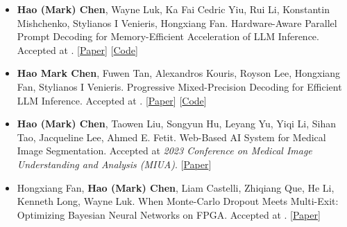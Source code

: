 \begin{itemize}
        \item \textbf{Hao (Mark) Chen}, Wayne Luk, Ka Fai Cedric Yiu, Rui Li, Konstantin Mishchenko, Stylianos I Venieris, Hongxiang Fan. Hardware-Aware Parallel Prompt Decoding for Memory-Efficient Acceleration of LLM Inference. Accepted at \EMNLP[2025]. [\href{https://arxiv.org/pdf/2405.18628}{Paper}] [\href{https://github.com/hmarkc/parallel-prompt-decoding}{Code}]
        \item \textbf{Hao Mark Chen}, Fuwen Tan, Alexandros Kouris, Royson Lee, Hongxiang Fan, Stylianos I Venieris. Progressive Mixed-Precision Decoding for Efficient LLM Inference. Accepted at \ICLR[2025]. [\href{https://arxiv.org/pdf/2410.13461}{Paper}] [\href{https://github.com/SamsungLabs/PMPD}{Code}]
        \item \textbf{Hao (Mark) Chen}, Taowen Liu, Songyun Hu, Leyang Yu, Yiqi Li, Sihan Tao, Jacqueline Lee, Ahmed E. Fetit. Web-Based AI System for Medical Image Segmentation. Accepted at \textit{2023 Conference on Medical Image Understanding and Analysis (MIUA)}. [\href{https://scholar.google.com/citations?view_op=view_citation&hl=en&user=O6ajbEoAAAAJ&pagesize=100&citation_for_view=O6ajbEoAAAAJ:u-x6o8ySG0sC}{Paper}]
        \item Hongxiang Fan, \textbf{Hao (Mark) Chen}, Liam Castelli, Zhiqiang Que, He Li, Kenneth Long, Wayne Luk. When Monte-Carlo Dropout Meets Multi-Exit: Optimizing Bayesian Neural Networks on FPGA. Accepted at \DAC[2023]. [\href{https://ieeexplore.ieee.org/iel7/10247654/10247655/10247954.pdf}{Paper}]
\end{itemize}

